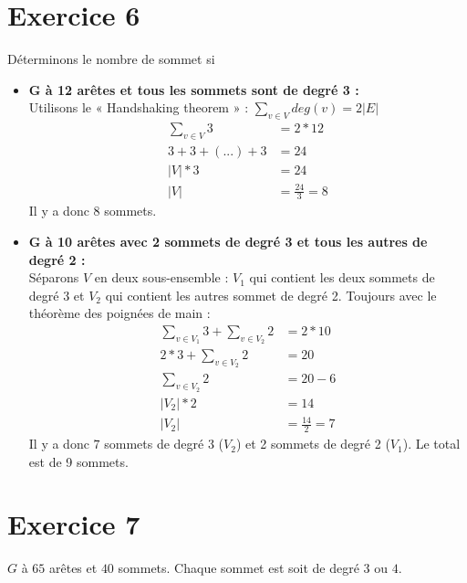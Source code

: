 \documentclass[fontsize=10pt]{article}
\begin{document}
\section*{Exercice 6}
Déterminons le nombre de sommet si
\begin{itemize}
    \item \textbf{G à 12 arêtes et tous les sommets sont de degré 3 :}\\
        Utilisons le « Handshaking theorem » : $ \displaystyle\sum_{v \in V} deg(v) = 2 |E|$\\
        \vspace{-.8em}
        \begin{align*}
            \displaystyle\sum_{v \in V} 3 &= 2 * 12\\
            3 + 3 + (...) + 3 &= 24\\
            |V| * 3 &= 24\\
            |V| &= \frac{24}{3} = 8
        \end{align*}
        Il y a donc $8$ sommets.

    \item \textbf{G à 10 arêtes avec 2 sommets de degré 3 et tous les autres de degré 2 :}\\
        Séparons $V$ en deux sous-ensemble : $V_{1}$ qui contient les deux
        sommets de degré 3 et $V_{2}$ qui contient les autres sommet de degré 2.
        Toujours avec le théorème des poignées de main :
        \vspace{-.8em}
        \begin{align*}
            \displaystyle\sum_{v \in V_{1}} 3 + \displaystyle\sum_{v \in V_{2}} 2 &= 2 * 10\\
            2 * 3 + \displaystyle\sum_{v \in V_{2}} 2 &= 20\\
            \displaystyle\sum_{v \in V_{2}} 2 &= 20 - 6\\
            |V_{2}| * 2 &= 14\\
            |V_{2}| &= \frac{14}{2} = 7
        \end{align*}
        Il y a donc $7$ sommets de degré 3 ($V_{2}$) et 2 sommets de degré
        2 ($V_{1}$). Le total est de 9 sommets.
\end{itemize}

\section*{Exercice 7}
$G$ à $65$ arêtes et $40$ sommets. Chaque sommet est soit de degré $3$ ou $4$.
\end{document}
